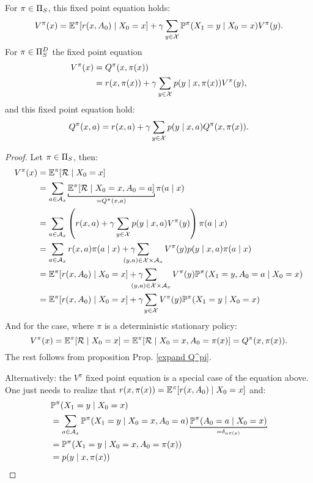\begin{corollary}\label{V^pi,Q^pi relation} 
For \(\pi\in\Pi_S\), this fixed point equation holds:
\[
	V^\pi(x) = \mathbb{E}^\pi[r(x,A_0)\mid X_0=x] 
	+ \gamma \sum_{y\in\mathcal{X}} \mathbb{P}^\pi(X_1=y \mid X_0=x) V^\pi(y).
\]	
For \(\pi\in\Pi_S^D\) the fixed point equation
\begin{align*}
	V^\pi(x)&=Q^\pi(x,\pi(x))\\
	 &=r(x,\pi(x))+\gamma\sum\limits_{y\in\mathcal{X}}p(y\mid x,\pi(x))V^\pi(y),
\end{align*}
and this fixed point equation hold:
\[
	Q^\pi(x,a)=r(x,a)+\gamma\sum_{y\in\mathcal{X}}p(y\mid x,a)Q^\pi(x,\pi(x)).
\]
\end{corollary}

\begin{proof} Let \(\pi\in\Pi_S\), then:
	\begin{align}
		V^\pi(x)&=\E^\pi[\cR\mid X_0=x] \nonumber\\
		&=\sum_{a\in\cA_x} 
		\underbracket[0.7pt]{\E^\pi[\cR\mid X_0=x, A_0=a]}_{=Q^\pi(x,a)}\label{stoch pi: V^pi in terms of Q^pi}
		\pi(a\mid x)\\
		&=\sum_{a\in\cA_x} \left(r(x,a)
		+\gamma\sum_{y\in\cX}p(y\mid x,a)V^\pi(y)\right)\pi(a\mid x)\nonumber\\
		&=\sum_{a\in\cA_x}r(x,a)\pi(a\mid x) 
		+ \gamma\smashoperator[l]{\sum_{(y,a)\in\cX\times\cA_x}} 
		V^\pi(y) p(y\mid x,a)\pi(a\mid x)
		\label{stoch pi: fixed point proof}\\
		&=\E^\pi[r(x,A_0)\mid X_0=x] 
		+ \gamma\smashoperator[l]{\sum_{(y,a)\in\cX\times\cA_x}} V^\pi(y)
		\Pr^\pi(X_1=y, A_0=a \mid X_0=x)\nonumber\\
		&=\E^\pi[r(x,A_0)\mid X_0=x] + \gamma\smashoperator[l]{\sum_{y\in\cX}} V^\pi(y)
		\Pr^\pi(X_1=y\mid X_0=x)\nonumber
	\end{align}
	And for the case, where \(\pi\) is a deterministic stationary policy:
	\[
		V^\pi(x)=\mathbb{E}^\pi[\mathcal{R}\mid X_0=x]=\mathbb{E}^\pi[\mathcal{R}\mid X_0=x, A_0=\pi(x)]=Q^\pi(x,\pi(x)).
	\]
	The rest follows from proposition Prop. \ref{expand Q^pi}. 
	
	Alternatively: the \(V^\pi\) fixed point equation is a special case of the equation above. One just needs to realize that \(r(x,\pi(x)) = \mathbb{E}^\pi[r(x,A_0)\mid X_0=x]\) and:
	\begin{align*}
		&\Pr^\pi(X_1=y\mid X_0=x)\\
		&=\sum_{a\in\cA_x} \Pr^\pi(X_1=y\mid X_0=x, A_0=a) 
		\underbracket[0.7pt][1pt]{\Pr^\pi(A_0=a\mid X_0=x)}_{=\delta_{a\pi(x)}}\\
		&=\Pr^\pi(X_1=y\mid X_0=x, A_0=\pi(x))\\
		&=p(y\mid x,\pi(x))\qedhere
	\end{align*}
\end{proof}

